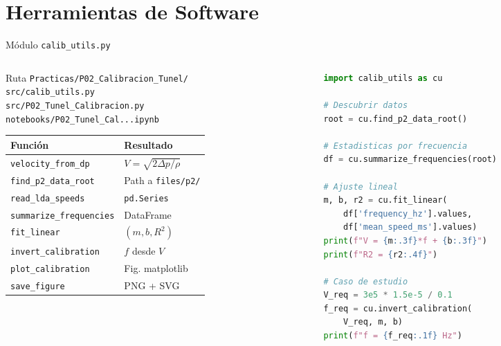 \documentclass[aspectratio=169,12pt]{beamer}
\begin{document}
\section{Herramientas de Software}

\begin{frame}[fragile]{Módulo \texttt{calib\_utils.py}}
	\begin{columns}
		\begin{column}{0.5\textwidth}
			\begin{block}{Ruta}
				\scriptsize
				\texttt{Practicas/P02\_Calibracion\_Tunel/\\
					src/calib\_utils.py}\\
				\texttt{src/P02\_Tunel\_Calibracion.py}\\
				\texttt{notebooks/P02\_Tunel\_Cal...ipynb}
			\end{block}
			\vspace{0.2em}
			\scriptsize
			\begin{tabular}{ll}
				\toprule
				\textbf{Función}                & \textbf{Resultado}          \\
				\midrule
				\texttt{velocity\_from\_dp}     & $V = \sqrt{2\Delta p/\rho}$ \\
				\texttt{find\_p2\_data\_root}   & Path a \texttt{files/p2/}   \\
				\texttt{read\_lda\_speeds}      & \texttt{pd.Series}          \\
				\texttt{summarize\_frequencies} & DataFrame                   \\
				\texttt{fit\_linear}            & $(m, b, R^2)$               \\
				\texttt{invert\_calibration}    & $f$ desde $V$               \\
				\texttt{plot\_calibration}      & Fig. matplotlib             \\
				\texttt{save\_figure}           & PNG + SVG                   \\
				\bottomrule
			\end{tabular}
		\end{column}
		\begin{column}{0.47\textwidth}
			\begin{lstlisting}[language=Python]
import calib_utils as cu

# Descubrir datos
root = cu.find_p2_data_root()

# Estadisticas por frecuencia
df = cu.summarize_frequencies(root)

# Ajuste lineal
m, b, r2 = cu.fit_linear(
    df['frequency_hz'].values,
    df['mean_speed_ms'].values)
print(f"V = {m:.3f}*f + {b:.3f}")
print(f"R2 = {r2:.4f}")

# Caso de estudio
V_req = 3e5 * 1.5e-5 / 0.1
f_req = cu.invert_calibration(
    V_req, m, b)
print(f"f = {f_req:.1f} Hz")
      \end{lstlisting}
		\end{column}
	\end{columns}
\end{frame}
\end{document}
